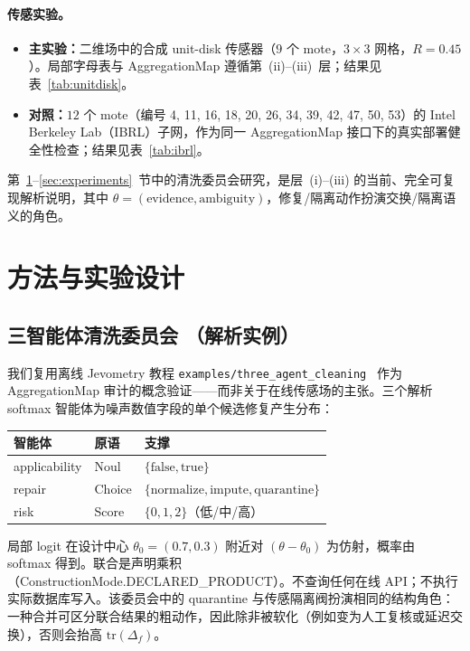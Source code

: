 \documentclass[11pt,a4paper]{article}
\begin{document}
\paragraph{传感实验。}
\begin{itemize}
  \item \textbf{主实验：}二维场中的合成 unit-disk 传感器（$9$ 个 mote，$3\times3$ 网格，$R=0.45$）。局部字母表与 AggregationMap 遵循第~(ii)--(iii)~层；结果见表~\ref{tab:unitdisk}。
  \item \textbf{对照：}$12$ 个 mote（编号 4, 11, 16, 18, 20, 26, 34, 39, 42, 47, 50, 53）的 Intel Berkeley Lab（IBRL）子网，作为同一 AggregationMap 接口下的真实部署健全性检查；结果见表~\ref{tab:ibrl}。
\end{itemize}
第~\ref{sec:method}--\ref{sec:experiments}~节中的清洗委员会研究，是层~(i)--(iii) 的当前、完全可复现解析说明，其中 $\theta=(\mathrm{evidence},\mathrm{ambiguity})$，修复/隔离动作扮演交换/隔离语义的角色。

\section{方法与实验设计}
\label{sec:method}

\subsection{三智能体清洗委员会
（解析实例）}

我们复用离线 Jevometry 教程 \texttt{examples/three\_agent\_cleaning}~\citep{jevometry2026} 作为 AggregationMap 审计的概念验证——而非关于在线传感场的主张。三个解析 softmax 智能体为噪声数值字段的单个候选修复产生分布：

\begin{center}
\begin{tabular}{lll}
\toprule
智能体 & 原语 & 支撑 \\
\midrule
applicability & Noul & $\{\mathrm{false},\mathrm{true}\}$ \\
repair & Choice & $\{\mathrm{normalize},\mathrm{impute},\mathrm{quarantine}\}$ \\
risk & Score & $\{0,1,2\}$（低/中/高） \\
\bottomrule
\end{tabular}
\end{center}

局部 logit 在设计中心 $\theta_0=(0.7,0.3)$ 附近对 $(\theta-\theta_0)$ 为仿射，概率由 softmax 得到。联合是声明乘积（ConstructionMode.DECLARED\_PRODUCT）。不查询任何在线 API；不执行实际数据库写入。该委员会中的 quarantine 与传感隔离阀扮演相同的结构角色：一种合并可区分联合结果的粗动作，因此除非被软化（例如变为人工复核或延迟交换），否则会抬高 $\mathrm{tr}(\Delta_f)$。
\end{document}

